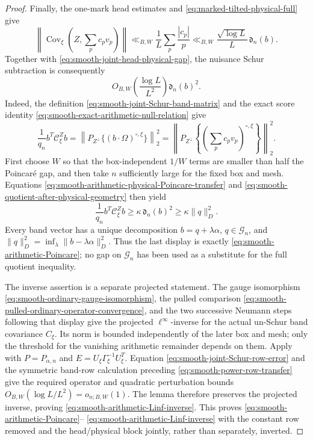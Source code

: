 \documentclass[11pt]{article}
\numberwithin{equation}{section}
\theoremstyle{definition}
\theoremstyle{remark}
\newcommand{\1}{\mathbf 1}
\begin{document}
\begin{proof}
Finally, the one-mark head estimates and
\eqref{eq:marked-tilted-physical-full} give
\[
 \left\|\operatorname{Cov}_\xi
   \left(Z,\sum_pc_pv_p\right)\right\|
 \ll_{B,W}\frac1L\sum_p\frac{|c_p|}{p}
 \ll_{B,W}\frac{\sqrt{\log L}}L\,\mathfrak d_n(b).
\]
Together with \eqref{eq:smooth-joint-head-physical-gap}, the nuisance
Schur subtraction is consequently
\[
 O_{B,W}\!\left(\frac{\log L}{L^2}\right)
                  \mathfrak d_n(b)^2.
\]
Indeed, the definition
\eqref{eq:smooth-joint-Schur-band-matrix} and the exact score identity
\eqref{eq:smooth-exact-arithmetic-null-relation} give
\[
 \frac1{q_n}b^T\mathcal C_\xi^Zb
 =\left\|P_{Z^\perp}\{(b\cdot\Omega)^{\circ,\xi}\}\right\|_2^2
 =\left\|P_{Z^\perp}
   \left\{\left(\sum_pc_pv_p\right)^{\circ,\xi}\right\}\right\|_2^2.
\]
First choose \(W\) so
that the box-independent \(1/W\) terms are smaller than half the
Poincar\'e gap, and then take \(n\) sufficiently large for the fixed box
and mesh.  Equations
\eqref{eq:smooth-arithmetic-physical-Poincare-transfer} and
\eqref{eq:smooth-quotient-after-physical-geometry} then yield
\begin{equation}
 \frac1{q_n}b^T\mathcal C_\xi^Zb
 \geq\kappa\,\mathfrak d_n(b)^2
 \geq\kappa\|q\|_D^2.
 \label{eq:smooth-full-quotient-from-minimizer}
\end{equation}
Every band vector has a unique decomposition
\(b=q+\lambda\alpha\), \(q\in\mathcal G_n\), and
\(\|q\|_D^2=\inf_\lambda\|b-\lambda\alpha\|_D^2\).  Thus the last display
is exactly \eqref{eq:smooth-arithmetic-Poincare}; no gap on
\(\mathcal G_n\) has been used as a substitute for the full quotient
inequality.

The inverse assertion is a separate projected statement.  The
gauge isomorphism
\eqref{eq:smooth-ordinary-gauge-isomorphism}, the pulled comparison
\eqref{eq:smooth-pulled-ordinary-operator-convergence}, and the two
successive Neumann steps following that display give the projected
\(\ell^\infty\)-inverse for the actual un-Schur band covariance
\(C_\xi\).  Its norm is bounded independently of the later box and
mesh; only the threshold for the vanishing arithmetic remainder depends
on them.  Apply
 with
\(P=P_{\alpha,n}\) and
\(E=U_\xi\Gamma_\xi^{-1}U_\xi^T\).
Equation \eqref{eq:smooth-joint-Schur-row-error} and the symmetric
band-row calculation preceding
\eqref{eq:smooth-power-row-transfer} give the required
operator and quadratic perturbation bounds
\(O_{B,W}(\log L/L^2)=o_{n;B,W}(1)\).  The lemma therefore preserves the
projected inverse, proving
\eqref{eq:smooth-arithmetic-Linf-inverse}.
This proves
\eqref{eq:smooth-arithmetic-Poincare}--
\eqref{eq:smooth-arithmetic-Linf-inverse} with the constant row removed
and the head/physical block jointly, rather than separately, inverted.
\end{proof}
\end{document}
